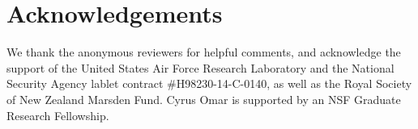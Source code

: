 



\section*{Acknowledgements}
We thank the anonymous reviewers for helpful comments, and acknowledge the support of the United States Air Force Research Laboratory and the National Security Agency lablet contract \#H98230-14-C-0140, as well as the Royal Society of New Zealand Marsden Fund. Cyrus Omar is supported by an NSF Graduate Research Fellowship.
